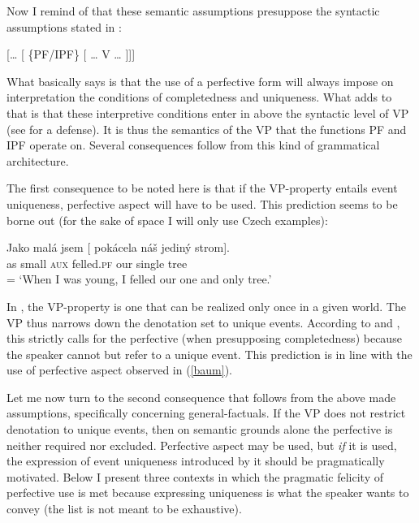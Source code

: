 \documentclass[output=paper,
modfonts,
newtxmath,
hidelinks
]{langscibook}
\begin{document}
\noindent Now I remind of that these semantic assumptions presuppose the syntactic assumptions stated in :

\begin{exe}
\ex\label{synas}
{} [{\dots} [ \{PF/IPF\} [ {\dots} V {\dots} ]]]
\end{exe}

\noindent What  basically says is that the use of a perfective form will always impose on interpretation the conditions of completedness
and uniqueness. What  adds to that is that these interpretive conditions enter in above the syntactic level of VP (see \citealt{Tate11,Tate13} for a defense). It is thus the semantics of the VP that the functions PF and IPF operate on. Several consequences follow from this kind of grammatical architecture.

The first consequence to be noted here is that if the VP-property entails event uniqueness, perfective aspect will have to be used.
This prediction seems to be borne out (for the sake of space I will only use Czech examples):

\begin{exe}
\ex\label{baum}
\gll Jako mal\'a jsem [ pok\'acela n\'a\v{s} jedin\'y strom].\\
as small \textsc{aux} {} felled.\textsc{pf} our single tree \\\hfill = 
\glt `When I was young, I felled our one and only tree.'
\end{exe}

\noindent In , the VP-property is one that can be realized only once in a given world. The VP thus narrows down the denotation set to unique events. According to  and , this strictly calls for the perfective (when presupposing completedness) because the speaker cannot but refer to a unique event. This prediction is in line with the use of perfective aspect observed in (\ref{baum}).


Let me now turn to the second consequence that follows from the above made assumptions, specifically concerning general-factuals. If the VP does not restrict denotation to unique events, then on semantic grounds alone the perfective is neither required nor excluded. Perfective aspect may be used, but \textit{if} it is used, the expression of event uniqueness introduced by it should be pragmatically motivated. Below I present three contexts in which the pragmatic felicity of perfective use is met because expressing uniqueness is what the speaker wants to convey (the list is not meant to be exhaustive).
\end{document}
